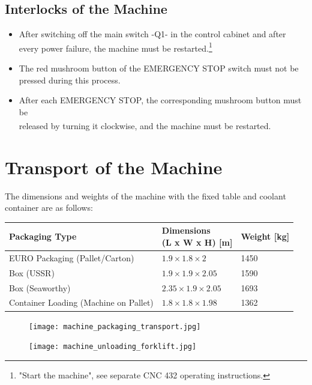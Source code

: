 \subsection{Interlocks of the Machine}
\begin{itemize}
    \item After switching off the main switch -Q1- in the control cabinet and after every power failure, the machine must be restarted.\footnote{"Start the machine", see separate CNC 432 operating instructions.}
    \item The red mushroom button of the EMERGENCY STOP switch must not be pressed during this process.
    \item After each EMERGENCY STOP, the corresponding mushroom button must be \\released by turning it clockwise, and the machine must be restarted.\textsuperscript{\thefootnote}
\end{itemize}

\section{Transport of the Machine}

The dimensions and weights of the machine with the fixed table and coolant container are as follows:

\begin{table}[h]
\centering
\begin{tabular}{lll}
\textbf{Packaging Type} & \makecell{\textbf{Dimensions}\\\textbf{(L x W x H) [m]}} & \textbf{Weight [kg]} \\ \hline
EURO Packaging (Pallet/Carton) & $1.9 \times 1.8 \times 2$ & 1450 \\
Box (USSR) & $1.9 \times 1.9 \times 2.05$ & 1590 \\
Box (Seaworthy) & $2.35 \times 1.9 \times 2.05$ & 1693 \\
Container Loading (Machine on Pallet) & $1.8 \times 1.8 \times 1.98$ & 1362 \\
\end{tabular}
\end{table}

\begin{figure}[h]
    \centering
    \begin{minipage}[b]{0.35\textwidth} %
        \centering
        \texttt{[image: machine\_packaging\_transport.jpg]} %
        \caption{}
        \label{fig:packaging}
    \end{minipage}
    \hfill
    \begin{minipage}[b]{0.55\textwidth} %
        \centering
        \texttt{[image: machine\_unloading\_forklift.jpg]} %
        \caption{}
        \label{fig:unloading}
    \end{minipage}
    \end{figure}

